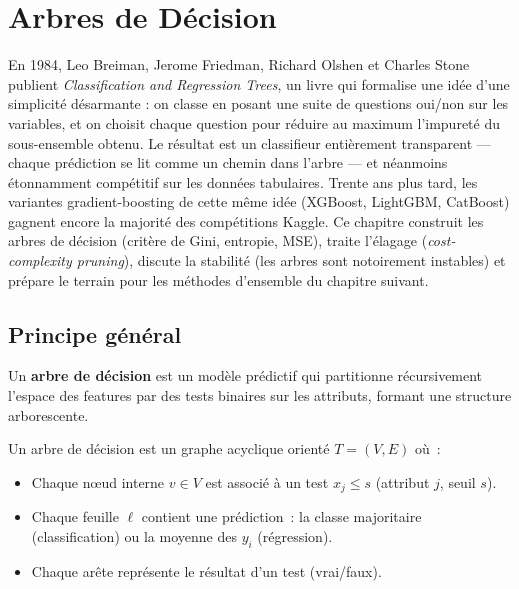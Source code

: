 \chapter{Arbres de D\'ecision}
\label{ch:arbres}

En 1984, Leo Breiman, Jerome Friedman, Richard Olshen et Charles Stone publient \emph{Classification and Regression Trees}, un livre qui formalise une idée d'une simplicité désarmante : on classe en posant une suite de questions oui/non sur les variables, et on choisit chaque question pour réduire au maximum l'impureté du sous-ensemble obtenu. Le résultat est un classifieur entièrement transparent --- chaque prédiction se lit comme un chemin dans l'arbre --- et néanmoins étonnamment compétitif sur les données tabulaires. Trente ans plus tard, les variantes gradient-boosting de cette même idée (XGBoost, LightGBM, CatBoost) gagnent encore la majorité des compétitions Kaggle. Ce chapitre construit les arbres de décision (critère de Gini, entropie, MSE), traite l'élagage (\emph{cost-complexity pruning}), discute la stabilité (les arbres sont notoirement instables) et prépare le terrain pour les méthodes d'ensemble du chapitre suivant.

\section{Principe g\'en\'eral}
\label{sec:arbres-principe}

Un \textbf{arbre de d\'ecision} est un mod\`ele
pr\'edictif qui partitionne r\'ecursivement l'espace des features par des
tests binaires sur les attributs, formant une structure arborescente.

\begin{definition}
Un arbre de d\'ecision est un graphe acyclique orient\'e $T = (V, E)$ o\`u~:
\begin{itemize}
  \item Chaque n\oe{}ud interne $v \in V$ est associ\'e \`a un test
    $x_j \leq s$ (attribut $j$, seuil $s$).
  \item Chaque feuille $\ell$ contient une pr\'ediction~:
    la classe majoritaire (classification) ou la moyenne des $y_i$
    (r\'egression).
  \item Chaque ar\^ete repr\'esente le r\'esultat d'un test (vrai/faux).
\end{itemize}
\end{definition}

